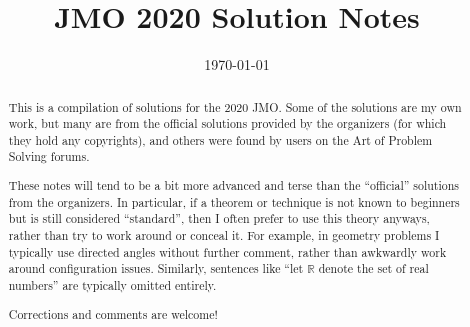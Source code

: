 \documentclass[11pt]{scrartcl}
\title{JMO 2020 Solution Notes}
\date{\today}
\begin{document}
\maketitle

\begin{abstract}
This is a compilation of solutions
for the 2020 JMO.
Some of the solutions are my own work,
but many are from the official solutions provided by the organizers
(for which they hold any copyrights),
and others were found by users on the Art of Problem Solving forums.

These notes will tend to be a bit more advanced and terse than the ``official''
solutions from the organizers.
In particular, if a theorem or technique is not known to beginners
but is still considered ``standard'', then I often prefer to
use this theory anyways, rather than try to work around or conceal it.
For example, in geometry problems I typically use directed angles
without further comment, rather than awkwardly work around configuration issues.
Similarly, sentences like ``let $\mathbb{R}$ denote the set of real numbers''
are typically omitted entirely.

Corrections and comments are welcome!
\end{abstract}

\tableofcontents
\newpage

\addtocounter{section}{-1}
\end{document}
